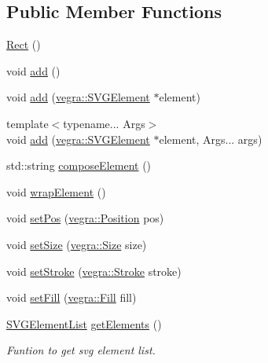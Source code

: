 \subsection*{Public Member Functions}
\begin{DoxyCompactItemize}
\item 
\mbox{\hyperlink{structvegra_1_1Rect_a5f7d578540b861188333858882d8fc09}{Rect}} ()
\item 
void \mbox{\hyperlink{structvegra_1_1Rect_a58f3d61bd592c6344d319da7eb7cee5c}{add}} ()
\item 
void \mbox{\hyperlink{structvegra_1_1Rect_a3d6fd5f777b1faca1a850e9ba5328434}{add}} (\mbox{\hyperlink{structvegra_1_1SVGElement}{vegra\+::\+S\+V\+G\+Element}} $\ast$element)
\item 
{\footnotesize template$<$typename... Args$>$ }\\void \mbox{\hyperlink{structvegra_1_1Rect_ae1d87cebca7a5eb3c9a2ce5e4782c2a6}{add}} (\mbox{\hyperlink{structvegra_1_1SVGElement}{vegra\+::\+S\+V\+G\+Element}} $\ast$element, Args... args)
\item 
std\+::string \mbox{\hyperlink{structvegra_1_1Rect_a2f18ab8fb102c330de2e388a4f5cb324}{compose\+Element}} ()
\item 
void \mbox{\hyperlink{structvegra_1_1Rect_a1a0b6b2fa5804f2554f62d41c3a156f3}{wrap\+Element}} ()
\item 
void \mbox{\hyperlink{structvegra_1_1Rect_ae4f9a214f68dd59bc5fc5fda2c746add}{set\+Pos}} (\mbox{\hyperlink{structvegra_1_1Position}{vegra\+::\+Position}} pos)
\item 
void \mbox{\hyperlink{structvegra_1_1Rect_a5aae282d87d00e7912620eee07b1c588}{set\+Size}} (\mbox{\hyperlink{structvegra_1_1Size}{vegra\+::\+Size}} size)
\item 
void \mbox{\hyperlink{structvegra_1_1Rect_a646ee5d4a13f051a08e03efcaecf8afb}{set\+Stroke}} (\mbox{\hyperlink{structvegra_1_1Stroke}{vegra\+::\+Stroke}} stroke)
\item 
void \mbox{\hyperlink{structvegra_1_1Rect_a42038bb978010d425ac7418bb5ca8c43}{set\+Fill}} (\mbox{\hyperlink{structvegra_1_1Fill}{vegra\+::\+Fill}} fill)
\item 
\mbox{\hyperlink{namespacevegra_a2722f5eceb74f65746a02a57b71d125e}{S\+V\+G\+Element\+List}} \mbox{\hyperlink{structvegra_1_1Rect_a8d02abb21b9198be69cd888a20ff664a}{get\+Elements}} ()
\begin{DoxyCompactList}\small\item\em Funtion to get svg element list. \end{DoxyCompactList}\item 

\end{DoxyCompactItemize}
